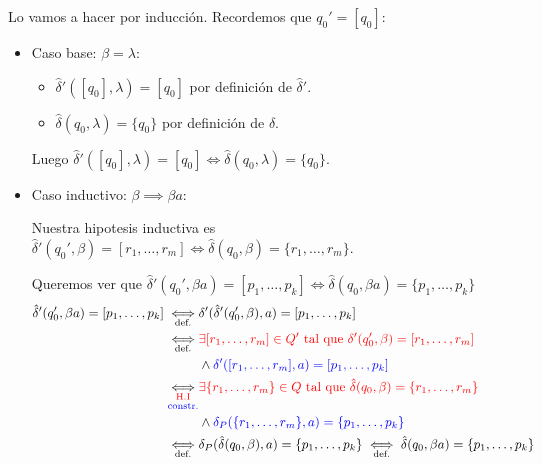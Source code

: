 Lo vamos a hacer por inducción. Recordemos que \(q_0' = [q_0]\):
\begin{itemize}
  \item Caso base: \(\beta = \lambda\):
        \begin{itemize}
          \item \(\hat{\delta}'([q_0],\lambda) = [q_0]\) por definición de \(\hat{\delta}'\).
          \item \(\hat{\delta}(q_0,\lambda) = \{q_0\}\) por definición de \(\hat{\delta}\).
        \end{itemize}
        Luego \(\hat{\delta}'([q_0],\lambda) = [q_0] \iff \hat{\delta}(q_0,\lambda) = \{q_0\}\).

  \item Caso inductivo: \(\beta \implies \beta a\):

        Nuestra hipotesis inductiva es \(\hat{\delta}'(q_0',\beta) = [r_1,\dots,r_m] \iff \hat{\delta}(q_0,\beta) = \{r_1,\dots, r_m\}\).

        Queremos ver que \(\hat{\delta}'(q_0',\beta a) = [p_1,\dots,p_k] \iff \hat{\delta}(q_0,\beta a) = \{p_1,\dots, p_k\}\)
        \begin{align*}
          \hat{\delta}'(q_0',\beta a) = [p_1,\dots,p_k]  \iffa{def.} & \delta'(\hat{\delta}'(q_0',\beta),a) = [p_1,\dots,p_k]                                                            \\
          \iffa{def.}                                                & \red{\exists [r_1,\dots,r_m]\in Q' \text{ tal que } \delta'(q_0',\beta) = [r_1,\dots,r_m]}                        \\
                                                                     & \land \blue{\delta'([r_1,\dots,r_m],a) = [p_1,\dots,p_k]}                                                         \\
          \iffab{\red{H.I}}{\blue{constr.}}                          & \red{\exists \{   r_1,\dots,r_m\}\in Q \text{ tal que } \hat{\delta}(q_0,\beta) = \{r_1,\dots,r_m\}}              \\
                                                                     & \land \blue{\delta_P(\{r_1,\dots,r_m\},a) = \{p_1,\dots,p_k\}}                                                    \\
          \iffa{def.}                                                & \delta_P(\hat{\delta}(q_0,\beta),a) = \{p_1,\dots,p_k\} \iffa{def.} \hat{\delta}(q_0,\beta a) = \{p_1,\dots,p_k\}
        \end{align*}
\end{itemize}

